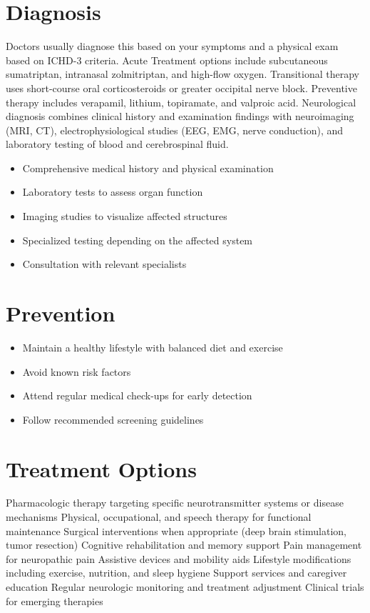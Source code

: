\section{Diagnosis}
Doctors usually diagnose this based on your symptoms and a physical exam based on ICHD-3 criteria. Acute Treatment options include subcutaneous sumatriptan, intranasal zolmitriptan, and high-flow oxygen. Transitional therapy uses short-course oral corticosteroids or greater occipital nerve block. Preventive therapy includes verapamil, lithium, topiramate, and valproic acid. Neurological diagnosis combines clinical history and examination findings with neuroimaging (MRI, CT), electrophysiological studies (EEG, EMG, nerve conduction), and laboratory testing of blood and cerebrospinal fluid.

\begin{itemize}[noitemsep]
  \item Comprehensive medical history and physical examination
  \item Laboratory tests to assess organ function
  \item Imaging studies to visualize affected structures
  \item Specialized testing depending on the affected system
  \item Consultation with relevant specialists
\end{itemize}
\section{Prevention}
\begin{itemize}[noitemsep]
  \item Maintain a healthy lifestyle with balanced diet and exercise
  \item Avoid known risk factors
  \item Attend regular medical check-ups for early detection
  \item Follow recommended screening guidelines
\end{itemize}
\section{Treatment Options}
Pharmacologic therapy targeting specific neurotransmitter systems or disease mechanisms Physical, occupational, and speech therapy for functional maintenance Surgical interventions when appropriate (deep brain stimulation, tumor resection) Cognitive rehabilitation and memory support Pain management for neuropathic pain Assistive devices and mobility aids Lifestyle modifications including exercise, nutrition, and sleep hygiene Support services and caregiver education Regular neurologic monitoring and treatment adjustment Clinical trials for emerging therapies

